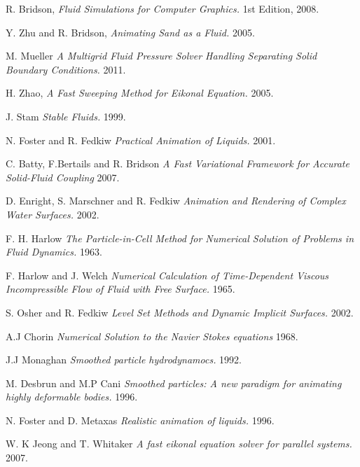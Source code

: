 \begin{thebibliography}{9}

  R. Bridson,
  \emph{Fluid Simulations for Computer Graphics.}
  1st Edition,
  2008.

  Y. Zhu and R. Bridson,
  \emph{Animating Sand as a Fluid.}
  2005.

  M. Mueller
  \emph{A Multigrid Fluid Pressure Solver Handling Separating Solid Boundary Conditions.}
  2011.

  H. Zhao, 
  \emph{A Fast Sweeping Method for Eikonal Equation.}
  2005.

  J. Stam
  \emph{Stable Fluids.}
  1999.

  N. Foster and R. Fedkiw
  \emph{Practical Animation of Liquids.}
  2001.

  C. Batty, F.Bertails and R. Bridson
  \emph{A Fast Variational Framework for Accurate Solid-Fluid Coupling}
  2007.

  D. Enright, S. Marschner and R. Fedkiw
  \emph{Animation and Rendering of Complex Water Surfaces.}
  2002.

  F. H. Harlow 
  \emph{The Particle-in-Cell Method for Numerical Solution of Problems in Fluid Dynamics.}
  1963.

  F. Harlow and J. Welch
  \emph{Numerical Calculation of Time-Dependent Viscous Incompressible Flow of Fluid with Free Surface.}
  1965.

  S. Osher and R. Fedkiw
  \emph{Level Set Methods and Dynamic Implicit Surfaces.}
  2002.

  A.J Chorin
  \emph{Numerical Solution to the Navier Stokes equations}
  1968.

 J.J Monaghan
 \emph{Smoothed particle hydrodynamocs.}
 1992.

  M. Desbrun and M.P Cani
  \emph {Smoothed particles: A new paradigm for animating highly deformable bodies.}
  1996.

  N. Foster and D. Metaxas
  \emph{Realistic animation of liquids.}
  1996.

  W. K Jeong and T. Whitaker
  \emph{A fast eikonal equation solver for parallel systems.}
  2007.

\end{thebibliography}
